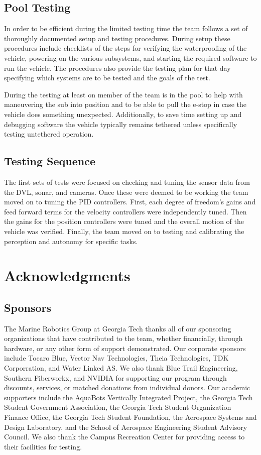 \documentclass[conference]{IEEEtran}
\begin{document}
\subsection{Pool Testing}
In order to be efficient during the limited testing time the team follows a set of thoroughly documented setup and testing procedures. During setup these procedures include checklists of the steps for verifying the waterproofing of the vehicle, powering on the various subsystems, and starting the required software to run the vehicle. The procedures also provide the testing plan for that day specifying which systems are to be tested and the goals of the test.

During the testing at least on member of the team is in the pool to help with maneuvering the sub into position and to be able to pull the e-stop in case the vehicle does something unexpected. Additionally, to save time setting up and debugging software the vehicle typically remains tethered unless specifically testing untethered operation.

\subsection{Testing Sequence}
The first sets of tests were focused on checking and tuning the sensor data from the DVL, sonar, and cameras. Once these were deemed to be working the team moved on to tuning the PID controllers. First, each degree of freedom's gains and feed forward terms for the velocity controllers were independently tuned. Then the gains for the position controllers were tuned and the overall motion of the vehicle was verified. Finally, the team moved on to testing and calibrating the perception and autonomy for specific tasks.

\section{Acknowledgments}

\subsection{Sponsors}

The Marine Robotics Group at Georgia Tech thanks all of our sponsoring organizations that have contributed to the team, whether financially, through hardware, or any other form of support demonstrated. Our corporate sponsors include Tocaro Blue, Vector Nav Technologies, Theia Technologies, TDK Corporration, and Water Linked AS. We also thank Blue Trail Engineering, Southern Fiberworkx, and NVIDIA for supporting our program through discounts, services, or matched donations from individual donors. Our academic supporters include the AquaBots Vertically Integrated Project, the Georgia Tech Student Government Association, the Georgia Tech Student Organization Finance Office, the Georgia Tech Student Foundation, the Aerospace Systems and Design Laboratory, and the School of Aerospace Engineering Student Advisory Council. We also thank the Campus Recreation Center for providing access to their facilities for testing. 
\end{document}

